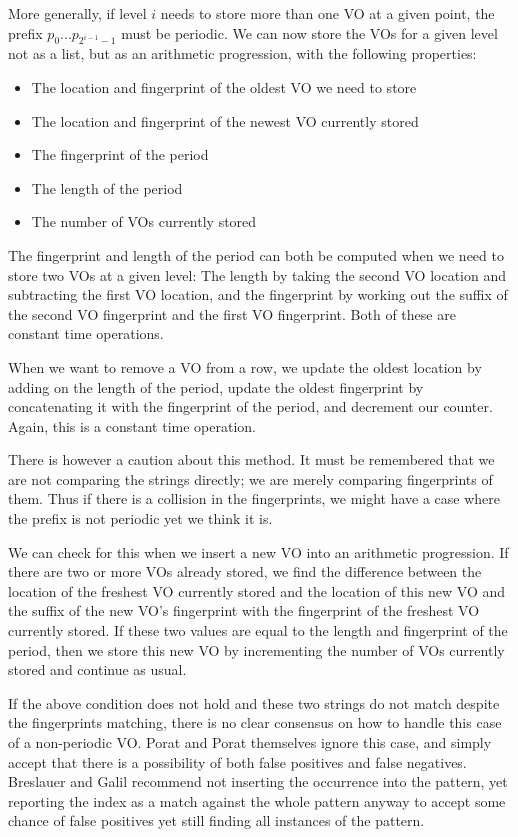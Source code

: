 \documentclass[ %
                    author={Dominic Joseph Moylett},
                    degree={MEng},
                     title={Dictionary Matching with Fingerprints},
                  subtitle={An Empirical Analysis},
                      type={Research},
                      year={2014} ]{dissertation}
\begin{document}
More generally, if level $i$ needs to store more than one VO at a given point, the prefix $p_0...p_{2^{i-1} - 1}$ must be periodic. We can now store the VOs for a given level not as a list, but as an arithmetic progression, with the following properties:

\begin{itemize}
  \item The location and fingerprint of the oldest VO we need to store
  \item The location and fingerprint of the newest VO currently stored
  \item The fingerprint of the period
  \item The length of the period
  \item The number of VOs currently stored
\end{itemize}

The fingerprint and length of the period can both be computed when we need to store two VOs at a given level: The length by taking the second VO location and subtracting the first VO location, and the fingerprint by working out the suffix of the second VO fingerprint and the first VO fingerprint. Both of these are constant time operations.

When we want to remove a VO from a row, we update the oldest location by adding on the length of the period, update the oldest fingerprint by concatenating it with the fingerprint of the period, and decrement our counter. Again, this is a constant time operation.

There is however a caution about this method. It must be remembered that we are not comparing the strings directly; we are merely comparing fingerprints of them. Thus if there is a collision in the fingerprints, we might have a case where the prefix is not periodic yet we think it is.

We can check for this when we insert a new VO into an arithmetic progression. If there are two or more VOs already stored, we find the difference between the location of the freshest VO currently stored and the location of this new VO and the suffix of the new VO's fingerprint with the fingerprint of the freshest VO currently stored. If these two values are equal to the length and fingerprint of the period, then we store this new VO by incrementing the number of VOs currently stored and continue as usual.

If the above condition does not hold and these two strings do not match despite the fingerprints matching, there is no clear consensus on how to handle this case of a non-periodic VO. Porat and Porat themselves ignore this case, and simply accept that there is a possibility of both false positives and false negatives. Breslauer and Galil\cite{Breslauer:2014:RSS:2660854.2635814} recommend not inserting the occurrence into the pattern, yet reporting the index as a match against the whole pattern anyway to accept some chance of false positives yet still finding all instances of the pattern.
\end{document}
